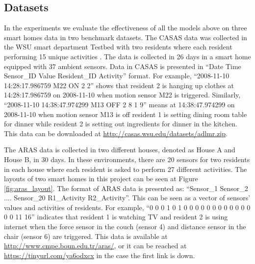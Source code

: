 \subsection{Datasets}
In the experiments we evaluate the effectiveness of all the models above on three smart homes data in two benchmark datasets. 
The CASAS data was
 collected in the WSU smart department Testbed with two residents
 where each resident performing 15 unique activities
 \cite{Cook_2010}. The data is collected in 26 days in a smart home
 equipped with 37 ambient sensors. Data in CASAS is presented in ``\textsf{Date Time Sensor\_ID Value Resident\_ID Activity}'' format. For example,  ``\textsf{2008-11-10 14:28:17.986759 M22 ON 2 2}'' shows that resident 2 is hanging up clothes at 14:28:17.986759 on 2008-11-10 when motion sensor M22 is triggered. Similarly, ``\textsf{2008-11-10 14:38:47.974299 M13 OFF 2 8 1 9}'' means at 14:38:47.974299 on 2008-11-10 when motion sensor M13 is off resident 1 is setting dining room table for dinner while resident 2 is setting out ingredients for dinner in the kitchen. This data can be downloaded at \url{http://casas.wsu.edu/datasets/adlmr.zip}.
 
 The ARAS data
\cite{Alemdar_2013} is collected in two different houses, denoted as
House A and House B, in 30 days. In these environments, there are 20
sensors for two residents in each house where each resident is asked to perform 27 different activities. The layouts of two smart homes in this project can be seen at Figure \ref{fig:aras_layout}. The format of ARAS data is presented as: ``\textsf{Sensor\_1 Sensor\_2 .... Sensor\_20   R1\_Activity R2\_Activity}''. This can be seen as a vector of sensors' values and activities of residents. For example, ``0 0 0 1 0 1 0 0 0 0 0 0 0 0 0 0 0 0 0 0 11 16'' indicates that resident 1 is watching TV and resident 2 is using internet when the force sensor in the couch (sensor 4) and distance sensor in the chair (sensor 6) are triggered. This data is available at \url{http://www.cmpe.boun.edu.tr/aras/}, or it can be reached at \url{https://tinyurl.com/ya6odxcx} in the case the first link is down. 


